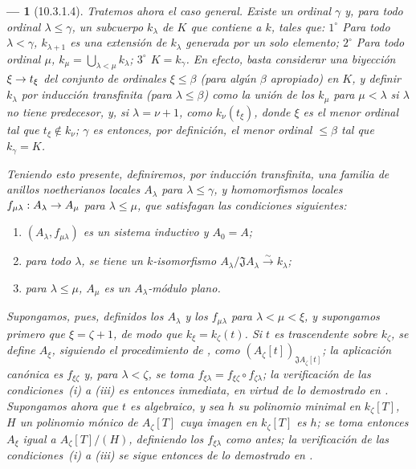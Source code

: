 \documentclass[10pt,oneside,openany]{book}
\theoremstyle{egaenv}\newtheorem*{env}{---}
\theoremstyle{egastatement}
\theoremstyle{egadescription}
\renewcommand{\leq}{\leqslant}
\renewcommand{\to}{\mathchoice{\longrightarrow}{\rightarrow}{\rightarrow}{\rightarrow}}
\begin{document}
\begin{env}[10.3.1.4]
\label{0.10.3.1.4}
\label{0.10.3.1.4-fr}
Tratemos ahora el caso general.
Existe un ordinal $\gamma$ y, para todo ordinal $\lambda\leq\gamma$, un subcuerpo $k_\lambda$ de $K$ que contiene a $k$, tales que: $1^\circ$ Para todo $\lambda<\gamma$,
$k_{\lambda+1}$ es una extensión de $k_\lambda$ generada por un solo elemento; $2^\circ$ Para todo ordinal $\mu$, $k_\mu=\bigcup_{\lambda<\mu}k_\lambda$;
$3^\circ$ $K=k_\gamma$.
En efecto, basta considerar una biyección $\xi\to t_\xi$ del conjunto de ordinales $\xi\leq\beta$ (para algún $\beta$ apropiado) en $K$, y definir $k_\lambda$ por inducción transfinita (para $\lambda\leq\beta$) como la unión de los $k_\mu$ para $\mu<\lambda$ si $\lambda$ no tiene predecesor, y, si $\lambda=\nu+1$, como $k_\nu(t_\xi)$, donde $\xi$ es el menor ordinal tal que $t_\xi\notin k_\nu$;
$\gamma$ es entonces, por definición, el menor ordinal $\leq\beta$ tal que $k_\gamma=K$.

Teniendo esto presente, definiremos, por inducción transfinita, una familia de anillos noetherianos locales $A_\lambda$ para $\lambda\leq\gamma$, y homomorfismos locales $f_{\mu\lambda}:A_\lambda\to A_\mu$ para $\lambda\leq\mu$, que satisfagan las condiciones siguientes:
\begin{enumerate}
  \item[(i)] $(A_\lambda,f_{\mu\lambda})$ es un sistema inductivo y $A_0=A$;
  \item[(ii)] para todo $\lambda$, se tiene un $k$-isomorfismo $A_\lambda/\mathfrak J A_\lambda\xrightarrow{\sim}k_\lambda$;
  \item[(iii)] para $\lambda\leq\mu$,
$A_\mu$ es un $A_\lambda$-módulo plano.
\end{enumerate}

Supongamos, pues, definidos los $A_\lambda$ y los $f_{\mu\lambda}$ para $\lambda<\mu<\xi$, y supongamos primero que $\xi=\zeta+1$, de modo que $k_\xi=k_\zeta(t)$.
Si $t$ es trascendente sobre $k_\zeta$, se define $A_\xi$, siguiendo el procedimiento de , como $(A_\zeta[t])_{\mathfrak J A_\zeta[t]}$;
la aplicación canónica es $f_{\xi\zeta}$ y, para $\lambda<\zeta$, se toma $f_{\xi\lambda}=f_{\xi\zeta}\circ f_{\zeta\lambda}$;
la verificación de las condiciones~(i) a (iii) es entonces inmediata, en virtud de lo demostrado en .
Supongamos ahora que $t$ es algebraico, y sea $h$ su polinomio minimal en $k_\zeta[T]$,
$H$ un polinomio mónico de $A_\zeta[T]$ cuya imagen en $k_\zeta[T]$ es $h$;
se toma entonces $A_\xi$ igual a $A_\zeta[T]/(H)$, definiendo los $f_{\xi\lambda}$ como antes;
la verificación de las condiciones~(i) a (iii) se sigue entonces de lo demostrado en .


\end{env}
\end{document}
